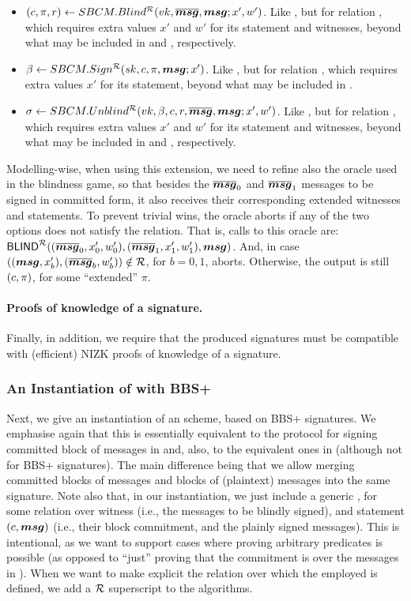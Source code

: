 \begin{itemize}
\item $(c,\pi,r) \gets SBCM.Blind^\mathcal{R}(vk,\overline{\boldsymbol{msg}},\boldsymbol{msg};x',w')$. Like
  \SBCMBlind, but for relation \NIZKRel, which requires extra values $x'$ and
  $w'$ for its statement and witnesses, beyond what may be included in \smsg and
  \osmsg, respectively.
\item $\beta \gets SBCM.Sign^\mathcal{R}(sk,c,\pi,\boldsymbol{msg};x')$. Like
  \SBCMSign, but for relation \NIZKRel, which requires extra values $x'$
  for its statement, beyond what may be included in \smsg.
\item $\sigma \gets SBCM.Unblind^\mathcal{R}(vk,\beta,c,r,\overline{\boldsymbol{msg}},\boldsymbol{msg};
  x',w')$. Like \SBCMUnblind, but for relation \NIZKRel, which requires extra
  values $x'$ and $w'$ for its statement and witnesses, beyond what may be
  included in \smsg and \osmsg, respectively.
\end{itemize}

Modelling-wise, when using this extension, we need to refine also the
 oracle used in the blindness game, so that besides the $\overline{\boldsymbol{msg}}_0$
and $\overline{\boldsymbol{msg}}_1$ messages to be signed in committed form, it also receives their
corresponding extended witnesses and statements. To prevent trivial wins, the
oracle aborts if any of the two options does not satisfy the relation. That is,
calls to this oracle are: $\mathsf{BLIND}^\mathcal{R}((\overline{\boldsymbol{msg}}_0,x'_0,w'_0),
(\overline{\boldsymbol{msg}}_1,x'_1,w'_1),\boldsymbol{msg})$. And, in case $((\boldsymbol{msg},x'_b),(\overline{\boldsymbol{msg}}_b,w'_b))
\notin \mathcal{R}$, for $b=0,1$,  aborts. Otherwise, the output
is still $(c,\pi)$, for some ``extended'' $\pi$.

\paragraph{Proofs of knowledge of a \SBCM signature.} %
Finally, in addition, we require that the produced signatures must be compatible
with (efficient) NIZK proofs of knowledge of a signature.

\subsubsection{An Instantiation of \SBCM with BBS+}

Next, we give an instantiation of an \SBCM scheme, based on BBS+ signatures.
We emphasise again that this is essentially equivalent to the protocol for
signing committed block of messages in \cite{asm06} and, also, to the equivalent
ones in \cite{cl02,ps16} (although not for BBS+ signatures). The main difference
being that we allow merging committed blocks of messages and blocks of
(plaintext) messages into the same signature.
%
Note also that, in our instantiation, we just include a generic \NIZK, for some
relation over witness \osmsg (i.e., the messages to be blindly
signed), and statement $(c,\boldsymbol{msg})$ (i.e., their block commitment, and the
plainly signed messages). This is intentional, as we want to support cases where
proving arbitrary predicates is possible (as opposed to ``just'' proving that
the commitment is over the messages in \osmsg).
%
When we want to make explicit the relation over which the employed \NIZK is
defined, we add a $\mathcal{R}$ superscript to the algorithms.

